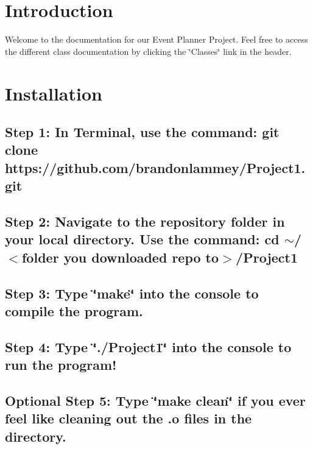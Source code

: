 \hypertarget{index_intro_sec}{}\section{Introduction}\label{index_intro_sec}
Welcome to the documentation for our Event Planner Project. Feel free to access the different class documentation by clicking the \char`\"{}\+Classes\char`\"{} link in the header.\hypertarget{index_install_sec}{}\section{Installation}\label{index_install_sec}
\hypertarget{index_step1}{}\subsection{Step 1\+: In Terminal, use the command\+: git clone https\+://github.\+com/brandonlammey/\+Project1.\+git}\label{index_step1}
\hypertarget{index_step2}{}\subsection{Step 2\+: Navigate to the repository folder in your local directory. Use the command\+: cd $\sim$/$<$folder you downloaded repo to$>$/\+Project1}\label{index_step2}
\hypertarget{index_step3}{}\subsection{Step 3\+: Type \char`\"{}make\char`\"{} into the console to compile the program.}\label{index_step3}
\hypertarget{index_step4}{}\subsection{Step 4\+: Type \char`\"{}./\+Project1\char`\"{} into the console to run the program!}\label{index_step4}
\hypertarget{index_step5}{}\subsection{Optional Step 5\+: Type \char`\"{}make clean\char`\"{} if you ever feel like cleaning out the .\+o files in the directory.}\label{index_step5}
